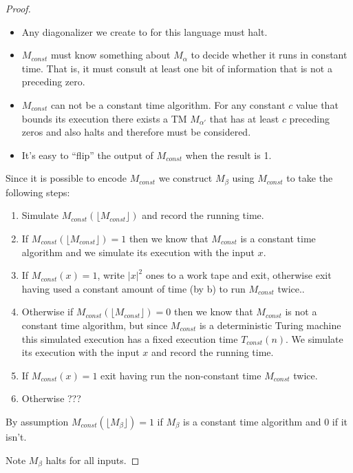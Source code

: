 \documentclass[usletter]{article}
\begin{document}
\begin{enumerate}
\begin{proof}
      \begin{itemize}
        \item Any diagonalizer we create to for this language must halt.
        \item $M_{const}$ must know something about $M_{\alpha}$ to decide whether it runs in constant time. That is, it must consult at least one bit of information that is not a preceding zero.
        \item $M_{const}$ can not be a constant time algorithm. For any constant $c$ value that bounds its execution there exists a TM $M_{\alpha'}$ that has at least $c$ preceding zeros and also halts and therefore must be considered.
        \item It's easy to ``flip'' the output of $M_{const}$ when the result is 1.
      \end{itemize}


      Since it is possible to encode $M_{const}$ we construct $M_{\beta}$ using $M_{const}$ to take the following steps:

        \begin{enumerate}
          \item Simulate $M_{const}(\lfloor M_{const} \rfloor)$ and record the running time.
          \item If $M_{const}(\lfloor M_{const} \rfloor) = 1$ then we know that $M_{const}$ is a constant time algorithm and we simulate its execution with the input $x$.
          \item If $M_{const}(x) = 1$, write $|x|^2$ ones to a work tape and exit, otherwise exit having used a constant amount of time (by b) to run $M_{const}$ twice..
          \item Otherwise if $M_{const}(\lfloor M_{const} \rfloor) = 0$ then we know that $M_{const}$ is not a constant time algorithm, but since $M_{const}$ is a deterministic Turing machine this simulated execution has a fixed execution time $T_{const}(n)$. We simulate its execution with the input $x$ and record the running time.
          \item If $M_{const}(x) = 1$ exit having run the non-constant time $M_{const}$ twice.
          \item Otherwise ???
        \end{enumerate}

        By assumption $M_{const}(\lfloor M_{\beta} \rfloor) = 1$ if $M_{\beta}$ is a constant time algorithm and $0$ if it isn't.

        Note $M_{\beta}$ halts for all inputs.
      \end{proof}


\end{enumerate}
\end{document}
